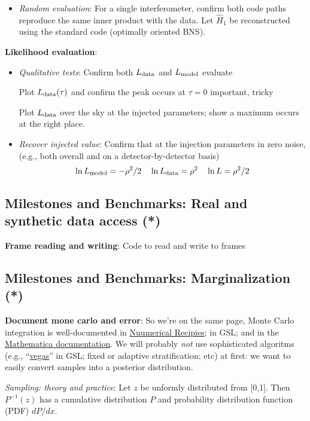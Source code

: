 \documentclass[twocolumn,prd,nofootinbib]{revtex4}
\newcommand\editremark[1]{{\color{red} #1}}
\begin{document}
\begin{widetext}
\begin{itemize}
\item \emph{Random evaluation}: For a single interferometer, confirm both code paths reproduce the same inner product
  with the data.   Let $\hat{H}_1$ be reconstructed using the standard code (optimally oriented BNS).
\end{itemize}

\noindent \textbf{Likelihood evaluation}:
\begin{itemize}
\item \emph{Qualitative tests}:  Confirm both $L_{\rm data}$ and $L_{\rm model}$ evaluate

Plot  $L_{\rm data}(\tau)$ and confirm the peak occurs at $\tau=0$ \editremark{important, tricky}

Plot $L_{\rm data}$ over the sky at the injected parameters; show a maximum occurs at the right place.

\item \emph{Recover injected value}: Confirm that at the injection parameters in zero noise, (e.g., both overall and on
  a detector-by-detector basis)
\[
\ln L_{\rm model}=-\rho^2/2 \quad 
\ln L_{\rm data} = \rho^2 \quad
\ln L = \rho^2/2
\]
\end{itemize}


\subsection{Milestones and Benchmarks: Real and synthetic data access (*)}

\noindent \textbf{Frame reading and writing}: Code to read and write to frames


\subsection{Milestones and Benchmarks: Marginalization (*)}


\noindent \textbf{Document mone carlo and error}: So we're on the same page, Monte Carlo integration is well-documented in \href{http://nr.com}{Nuumerical Recipies}; in
GSL; and in the \href{http://reference.wolfram.com/mathematica/tutorial/NIntegrateIntegrationStrategies.html}{Mathematica documentation}.  We will probably \emph{not} use sophisticated algoritms (e.g.,
``\href{http://www.gnu.org/software/gsl/manual/html_node/VEGAS.html#VEGAS}{vegas}'' in GSL; fixed or adaptive stratification; etc) at first: we want to easily convert samples into a posterior distribution.


\emph{Sampling: theory and practice}: Let $z$ be unformly distributed from [0,1]. Then $P^{-1}(z)$ has a cumulative distribution $P$
and probability distribution function (PDF) $dP/dx$.  


\end{widetext}
\end{document}
